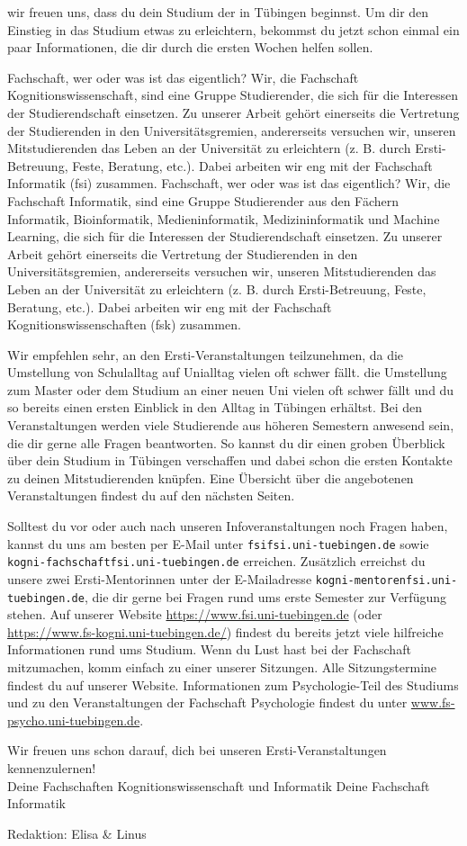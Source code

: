 \thispagestyle{firststyle}
wir freuen uns, dass du dein Studium der \studiengang in Tübingen beginnst.
Um dir den Einstieg in das Studium etwas zu erleichtern, bekommst du jetzt schon einmal
ein paar Informationen, die dir durch die ersten Wochen helfen sollen.

\ifkogwiss
\glqq Fachschaft\grqq, wer oder was ist das eigentlich? Wir, die Fachschaft Kognitionswissenschaft, 
sind eine Gruppe Studierender, die sich für die Interessen der Studierendschaft einsetzen. Zu unserer Arbeit
gehört einerseits die Vertretung der Studierenden in den Universitätsgremien, andererseits versuchen wir, unseren
Mitstudierenden das Leben an der Universität zu erleichtern (z. B. durch Ersti-Betreuung, Feste, Beratung, etc.). 
Dabei arbeiten wir eng mit der Fachschaft Informatik (fsi) zusammen.
\else
\glqq Fachschaft\grqq, wer oder was ist das eigentlich? Wir, die Fachschaft Informatik, sind eine Gruppe Studierender aus den Fächern
Informatik, Bioinformatik, Medieninformatik, Medizininformatik und Machine Learning, die sich für die Interessen der Studierendschaft einsetzen. Zu unserer Arbeit
gehört einerseits die Vertretung der Studierenden in den Universitätsgremien, andererseits versuchen wir, unseren
Mitstudierenden das Leben an der Universität zu erleichtern (z. B. durch Ersti-Betreuung, Feste, Beratung, etc.). 
Dabei arbeiten wir eng mit der Fachschaft Kognitionswissenschaften (fsk) zusammen.
\fi

Wir empfehlen sehr, an den Ersti-Veranstaltungen teilzunehmen, da 
\ifbachelor 
die Umstellung von Schulalltag auf Unialltag vielen oft schwer fällt. 
\fi
\ifmaster
die Umstellung zum Master oder dem Studium an einer neuen Uni vielen oft schwer fällt und du so bereits einen ersten Einblick in den Alltag in Tübingen erhältst.
\fi 
Bei den Veranstaltungen werden viele Studierende aus höheren Semestern anwesend sein, die dir gerne alle Fragen beantworten. 
So kannst du dir einen groben Überblick über dein Studium in Tübingen verschaffen und dabei schon die ersten Kontakte zu deinen Mitstudierenden knüpfen.
Eine Übersicht über die angebotenen Veranstaltungen findest du auf den nächsten Seiten.

Solltest du vor oder auch nach unseren Infoveranstaltungen noch Fragen haben, kannst du uns
am besten per E-Mail unter \texttt{fsi\At fsi.uni-tuebingen.de}
\ifkogwiss
sowie \texttt{kogni-fachschaft\At fsi.uni-tuebingen.de}
\fi
erreichen.
\ifkogwiss
Zusätzlich erreichst du unsere zwei Ersti-Mentorinnen unter der E-Mailadresse \texttt{kogni-mentoren\At fsi.uni-tuebingen.de}, die dir gerne bei Fragen rund ums erste Semester zur Verfügung stehen.
\fi
Auf unserer Website {\url{https://www.fsi.uni-tuebingen.de}} (oder {\url{https://www.fs-kogni.uni-tuebingen.de/}}) findest du bereits
jetzt viele hilfreiche Informationen rund ums Studium. Wenn du Lust hast bei der Fachschaft mitzumachen,
komm einfach zu einer unserer Sitzungen. Alle Sitzungstermine findest du auf unserer Website.
\ifkogwiss  Informationen zum Psychologie-Teil des Studiums und zu den Veranstaltungen der
Fachschaft Psychologie findest du unter \url{www.fs-psycho.uni-tuebingen.de}.\fi

Wir freuen uns schon darauf, dich bei unseren Ersti-Veranstaltungen kennenzulernen!\\
\ifkogwiss
Deine Fachschaften Kognitionswissenschaft und Informatik
\else
Deine Fachschaft Informatik
\hfill
{\footnotesize Redaktion: Elisa \& Linus\par}
\fi
\vfill
